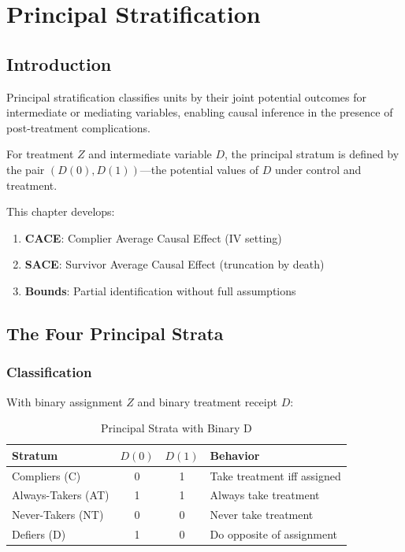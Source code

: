 \chapter{Principal Stratification}
\label{ch:principal-strat}

\section{Introduction}

Principal stratification \parencite{frangakis2002principal} classifies units by their joint potential outcomes for intermediate or mediating variables, enabling causal inference in the presence of post-treatment complications.

\begin{definition}
For treatment $Z$ and intermediate variable $D$, the principal stratum is defined by the pair $(D(0), D(1))$---the potential values of $D$ under control and treatment.
\end{definition}

This chapter develops:
\begin{enumerate}
\item \textbf{CACE}: Complier Average Causal Effect (IV setting)
\item \textbf{SACE}: Survivor Average Causal Effect (truncation by death)
\item \textbf{Bounds}: Partial identification without full assumptions
\end{enumerate}


\section{The Four Principal Strata}

\subsection{Classification}

With binary assignment $Z$ and binary treatment receipt $D$:

\begin{table}[h]
\centering
\caption{Principal Strata with Binary D}
\begin{tabular}{lccl}
\toprule
Stratum & $D(0)$ & $D(1)$ & Behavior \\
\midrule
Compliers (C) & 0 & 1 & Take treatment iff assigned \\
Always-Takers (AT) & 1 & 1 & Always take treatment \\
Never-Takers (NT) & 0 & 0 & Never take treatment \\
Defiers (D) & 1 & 0 & Do opposite of assignment \\
\bottomrule
\end{tabular}
\end{table}

